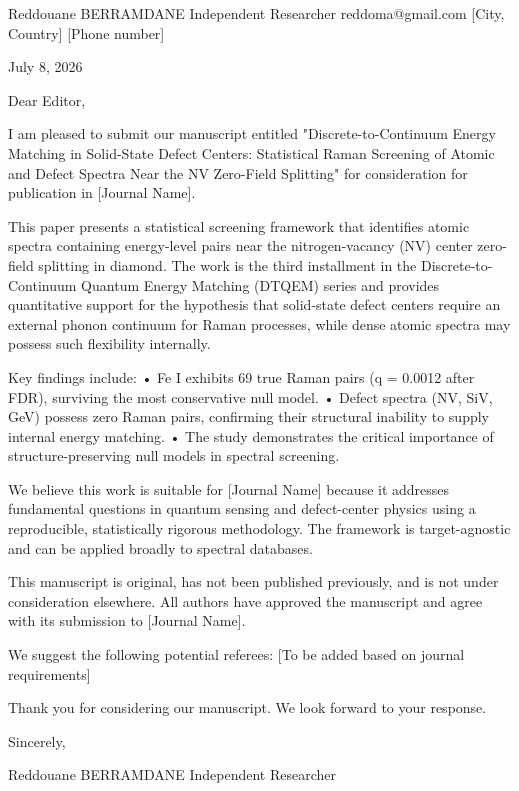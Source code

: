 Reddouane BERRAMDANE
Independent Researcher
reddoma@gmail.com
[City, Country]
[Phone number]

July 8, 2026

Dear Editor,

I am pleased to submit our manuscript entitled "Discrete-to-Continuum 
Energy Matching in Solid-State Defect Centers: Statistical Raman 
Screening of Atomic and Defect Spectra Near the NV Zero-Field Splitting" 
for consideration for publication in [Journal Name].

This paper presents a statistical screening framework that identifies 
atomic spectra containing energy-level pairs near the nitrogen-vacancy 
(NV) center zero-field splitting in diamond. The work is the third 
installment in the Discrete-to-Continuum Quantum Energy Matching (DTQEM) 
series and provides quantitative support for the hypothesis that 
solid-state defect centers require an external phonon continuum for 
Raman processes, while dense atomic spectra may possess such 
flexibility internally.

Key findings include:
• Fe I exhibits 69 true Raman pairs (q = 0.0012 after FDR), surviving 
  the most conservative null model.
• Defect spectra (NV, SiV, GeV) possess zero Raman pairs, confirming 
  their structural inability to supply internal energy matching.
• The study demonstrates the critical importance of structure-preserving 
  null models in spectral screening.

We believe this work is suitable for [Journal Name] because it addresses 
fundamental questions in quantum sensing and defect-center physics using 
a reproducible, statistically rigorous methodology. The framework is 
target-agnostic and can be applied broadly to spectral databases.

This manuscript is original, has not been published previously, and is 
not under consideration elsewhere. All authors have approved the 
manuscript and agree with its submission to [Journal Name].

We suggest the following potential referees:
[To be added based on journal requirements]

Thank you for considering our manuscript. We look forward to your 
response.

Sincerely,

Reddouane BERRAMDANE
Independent Researcher
